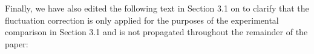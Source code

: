 \documentclass[11pt,a4paper]{letter} %
\newcommand*{\rood}[1]{{\color{red}{#1}}}
\newcommand*{\noteg}[1]{\textcolor{green}{[[#1]]}}		%
\begin{document}






Finally, we have also edited the following text in Section 3.1 on \rood{p.~16} to clarify that the fluctuation correction is only applied for the purposes of the experimental comparison in Section 3.1 and is not propagated throughout the remainder of the paper:
\end{document}
